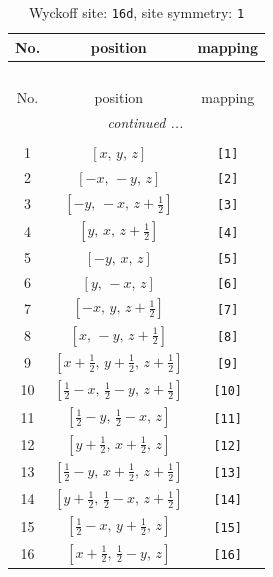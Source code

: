\documentclass[fleqn,8pt]{jsarticle}
\begin{document}
\begin{longtable}{ccc}
\caption{Wyckoff site: {\tt 16d}, site symmetry: {\tt 1}}
 \\
 \hline \hline
No. & position & mapping \\ \hline \endfirsthead

\multicolumn{2}{l}{\tablename\ \thetable{}} \\
 \hline \hline
No. & position & mapping \\ \hline \endhead

 \hline \hline
\multicolumn{2}{r}{\footnotesize\it continued ...} \\ \endfoot

 \hline \hline
\multicolumn{2}{r}{} \\ \endlastfoot

1 & $\left[ x,\, y,\, z \right]$ & {\tt [1]} \\ \hline
2 & $\left[ - x,\, - y,\, z \right]$ & {\tt [2]} \\ \hline
3 & $\left[ - y,\, - x,\, z + \frac{1}{2} \right]$ & {\tt [3]} \\ \hline
4 & $\left[ y,\, x,\, z + \frac{1}{2} \right]$ & {\tt [4]} \\ \hline
5 & $\left[ - y,\, x,\, z \right]$ & {\tt [5]} \\ \hline
6 & $\left[ y,\, - x,\, z \right]$ & {\tt [6]} \\ \hline
7 & $\left[ - x,\, y,\, z + \frac{1}{2} \right]$ & {\tt [7]} \\ \hline
8 & $\left[ x,\, - y,\, z + \frac{1}{2} \right]$ & {\tt [8]} \\ \hline
9 & $\left[ x + \frac{1}{2},\, y + \frac{1}{2},\, z + \frac{1}{2} \right]$ & {\tt [9]} \\ \hline
10 & $\left[ \frac{1}{2} - x,\, \frac{1}{2} - y,\, z + \frac{1}{2} \right]$ & {\tt [10]} \\ \hline
11 & $\left[ \frac{1}{2} - y,\, \frac{1}{2} - x,\, z \right]$ & {\tt [11]} \\ \hline
12 & $\left[ y + \frac{1}{2},\, x + \frac{1}{2},\, z \right]$ & {\tt [12]} \\ \hline
13 & $\left[ \frac{1}{2} - y,\, x + \frac{1}{2},\, z + \frac{1}{2} \right]$ & {\tt [13]} \\ \hline
14 & $\left[ y + \frac{1}{2},\, \frac{1}{2} - x,\, z + \frac{1}{2} \right]$ & {\tt [14]} \\ \hline
15 & $\left[ \frac{1}{2} - x,\, y + \frac{1}{2},\, z \right]$ & {\tt [15]} \\ \hline
16 & $\left[ x + \frac{1}{2},\, \frac{1}{2} - y,\, z \right]$ & {\tt [16]} \\
\end{longtable}
\end{document}
